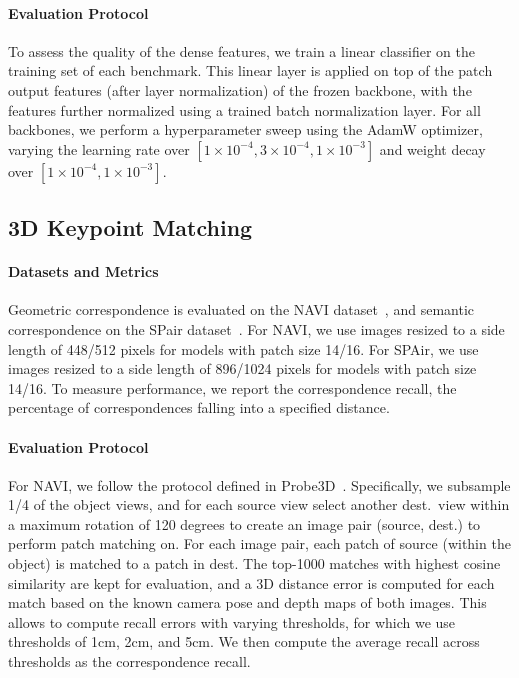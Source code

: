 \paragraph{Evaluation Protocol}
To assess the quality of the dense features, we train a linear classifier on the training set of each benchmark. This linear layer is applied on top of the patch output features (after layer normalization) of the frozen backbone, with the features further normalized using a trained batch normalization layer.
For all backbones, we perform a hyperparameter sweep using the AdamW optimizer, varying the learning rate over \([1 \times 10^{-4}, 3 \times 10^{-4}, 1 \times 10^{-3}]\) and weight decay over \([1 \times 10^{-4}, 1 \times 10^{-3}]\).

\subsection{3D Keypoint Matching}
\label{app:exp-details:keypoint-matching}

\paragraph{Datasets and Metrics}
Geometric correspondence is evaluated on the NAVI dataset~\citep{jampani2023navi}, and semantic correspondence on the SPair dataset~\citep{min2019spair71k}.
For NAVI, we use images resized to a side length of 448/512 pixels  for models with patch size 14/16.
For SPAir, we use images resized to a side length of 896/1024 pixels for models with patch size 14/16.
To measure performance, we report the correspondence recall, \ie the percentage of correspondences falling into a specified distance.

\paragraph{Evaluation Protocol}
For NAVI, we follow the protocol defined in Probe3D~\citep{banani2024probing}.
Specifically, we subsample 1/4 of the object views, and for each source view select another dest.~view within a maximum rotation of 120 degrees to create an image pair (source, dest.) to perform patch matching on. 
For each image pair, each patch of source (within the object) is matched to a patch in dest. 
The top-1000 matches with highest cosine similarity are kept for evaluation, and a 3D distance error is computed for each match based on the known camera pose and depth maps of both images. 
This allows to compute recall errors with varying thresholds, for which we use thresholds of 1cm, 2cm, and 5cm.
We then compute the average recall across thresholds as the correspondence recall.

